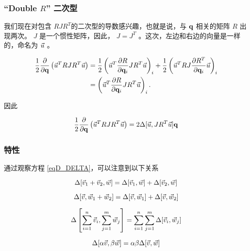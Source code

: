 \subsubsection{``Double $R$'' 二次型}

我们现在对包含 $RJR^T$的二次型的导数感兴趣，也就是说，与 $\mathbf{q}$ 相关的矩阵 $R$ 出现两次。 $J$ 是一个惯性矩阵，因此， $J=J^T$ 。这次，左边和右边的向量是一样的，命名为 $\vec{u}$ 。

\begin{align*}
\frac{1}{2}\frac{\partial }{\partial \mathbf{q}} \left( \vec{u}^TRJR^T\vec{u}\right)  &=
\frac{1}{2} \left(   \vec{u}^T  \frac{\partial R}{\partial \mathbf{q}_i}  JR^T   \vec{u}   \right)_i  +
\frac{1}{2} \left(   \vec{u}^T RJ  \frac{\partial R^T}{\partial \mathbf{q}_i}   \vec{u}   \right)_i  \\
  &=   \left(   \vec{u}^T  \frac{\partial R}{\partial \mathbf{q}_i}  JR^T   \vec{u}   \right)_i .
\end{align*}

因此

\begin{equation}
\frac{1}{2}\frac{\partial }{\partial \mathbf{q}} \left( \vec{u}^TRJR^T\vec{u}\right)  = 2 \Delta[\vec{u},JR^T\vec{u}] \mathbf{q}
\label{eqD_DELTAq3}
\end{equation}

\subsubsection{特性}

通过观察方程 \eqref{eqD_DELTA}，可以注意到以下关系


\begin{equation}
 \Delta[\vec{v}_1+\vec{v}_2,\vec{w}] = \Delta[\vec{v}_1,\vec{w}] + \Delta[\vec{v}_2,\vec{w}] 
\label{eqD_DELTA_r1}
\end{equation}

\begin{equation}
 \Delta[\vec{v},\vec{w}_1+\vec{w}_2] = \Delta[\vec{v},\vec{w}_1] + \Delta[\vec{v},\vec{w}_2] 
\label{eqD_DELTA_r2}
\end{equation}

\begin{equation}
 \Delta \left[\sum_{i=1}^{n}\vec{v}_i,\sum_{j=1}^{m}\vec{w}_j \right] = \sum_{i=1}^{n} \sum_{j=1}^{m} \Delta[\vec{v}_i,\vec{w}_j] 
\label{eqD_DELTA_r3}
\end{equation}

\begin{equation}
 \Delta[\alpha \vec{v},\beta \vec{w}] = \alpha \beta \Delta[\vec{v},\vec{w}]  
\label{eqD_DELTA_r4}
\end{equation}


